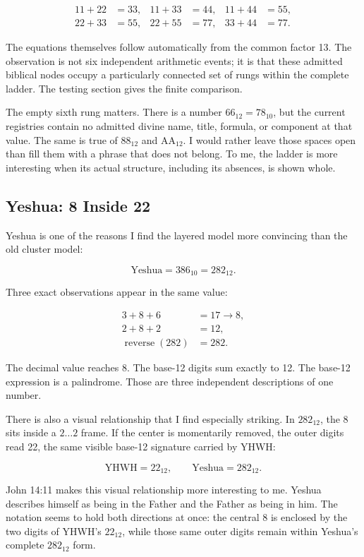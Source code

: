 \begin{align*}
11+22&=33, & 11+33&=44, & 11+44&=55,\\
22+33&=55, & 22+55&=77, & 33+44&=77.
\end{align*}

The equations themselves follow automatically from the common factor 13. The observation is not six independent arithmetic events; it is that these admitted biblical nodes occupy a particularly connected set of rungs within the complete ladder. The testing section gives the finite comparison.

The empty sixth rung matters. There is a number $66_{12}=78_{10}$, but the current registries contain no admitted divine name, title, formula, or component at that value. The same is true of $88_{12}$ and $\mathrm{AA}_{12}$. I would rather leave those spaces open than fill them with a phrase that does not belong. To me, the ladder is more interesting when its actual structure, including its absences, is shown whole.

\subsection{Yeshua: 8 Inside 22}

Yeshua is one of the reasons I find the layered model more convincing than the old cluster model:

\[
\text{Yeshua}=386_{10}=282_{12}.
\]

Three exact observations appear in the same value:

\begin{align*}
3+8+6 &= 17\rightarrow8,\\
2+8+2 &= 12,\\
\operatorname{reverse}(282) &= 282.
\end{align*}

The decimal value reaches 8. The base-12 digits sum exactly to 12. The base-12 expression is a palindrome. Those are three independent descriptions of one number.

There is also a visual relationship that I find especially striking. In $282_{12}$, the 8 sits inside a $2\ldots2$ frame. If the center is momentarily removed, the outer digits read 22, the same visible base-12 signature carried by YHWH:

\[
\text{YHWH}=22_{12},
\qquad
\text{Yeshua}=2\boxed{8}2_{12}.
\]

John 14:11 makes this visual relationship more interesting to me. Yeshua describes himself as being in the Father and the Father as being in him. The notation seems to hold both directions at once: the central 8 is enclosed by the two digits of YHWH's $22_{12}$, while those same outer digits remain within Yeshua's complete $282_{12}$ form.


